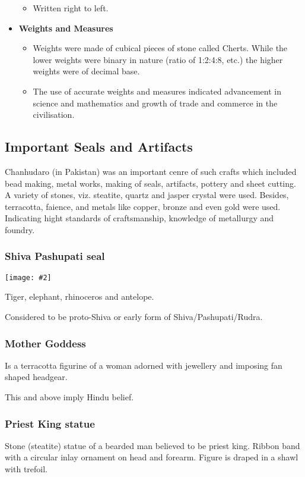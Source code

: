 \documentclass[8pt, a4paper, oneside, twocolumn]{extarticle}
\newcommand{\iph}[2]{
    \texttt{[image: \#2]}
}
\begin{document}
\begin{itemize}
\begin{itemize}
      \item Written right to left.
    \end{itemize}
  \item \textbf{Weights and Measures}
    \begin{itemize}
      \item Weights were made of cubical pieces of stone called Cherts. While the lower weights were binary in nature  (ratio of 1:2:4:8, etc.) the higher weights were of decimal base. 
      \item The use of accurate weights and measures indicated advancement in science and mathematics and growth of trade and commerce in the civilisation.
    \end{itemize}
\end{itemize}
\subsection{Important Seals and Artifacts}
Chanhudaro (in Pakistan) was an important cenre of such crafts which included bead making, metal works, making of seals, artifacts, pottery and sheet cutting. A variety of stones, viz. steatite, quartz and jasper crystal were used. Besides, terracotta, faience, and metals like copper, bronze and even gold were used. Indicating hight standards of craftsmanship, knowledge of metallurgy and foundry. 
\subsubsection{Shiva Pashupati seal}
\iph{0.4}{pashupati}

Tiger, elephant, rhinoceros and antelope.

Considered to be proto-Shiva or early form of Shiva/Pashupati/Rudra.
\subsubsection{Mother Goddess}

Is a terracotta figurine of a woman adorned with jewellery and imposing fan shaped headgear.

This and above imply Hindu belief.
\subsubsection{Priest King statue}

Stone (steatite) statue of a bearded man believed to be priest king. Ribbon band with a circular inlay ornament on head and forearm. Figure is draped in a shawl with trefoil.
\end{document}
